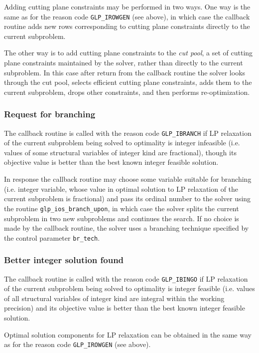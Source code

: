 Adding cutting plane constraints may be performed in two ways.
One way is the same as for the reason code \verb|GLP_IROWGEN| (see
above), in which case the callback routine adds new rows corresponding
to cutting plane constraints directly to the current subproblem.

The other way is to add cutting plane constraints to the {\it cut pool},
a set of cutting plane constraints maintained by the solver, rather than
directly to the current subproblem. In this case after return from the
callback routine the solver looks through the cut pool, selects
efficient cutting plane constraints, adds them to the current
subproblem, drops other constraints, and then performs re-optimization.

\subsubsection*{Request for branching}

The callback routine is called with the reason code \verb|GLP_IBRANCH|
if LP relaxation of the current subproblem being solved to optimality
is integer infeasible (i.e. values of some structural variables of
integer kind are fractional), though its objective value is better than
the best known integer feasible solution.

In response the callback routine may choose some variable suitable for
branching (i.e. integer variable, whose value in optimal solution to
LP relaxation of the current subproblem is fractional) and pass its
ordinal number to the solver using the routine
\verb|glp_ios_branch_upon|, in which case the solver splits the current
subproblem in two new subproblems and continues the search. If no choice
is made by the callback routine, the solver uses a branching technique
specified by the control parameter \verb|br_tech|.

\subsubsection*{Better integer solution found}

The callback routine is called with the reason code \verb|GLP_IBINGO|
if LP relaxation of the current subproblem being solved to optimality
is integer feasible (i.e. values of all structural variables of integer
kind are integral within the working precision) and its objective value
is better than the best known integer feasible solution.

Optimal solution components for LP relaxation can be obtained in the
same way as for the reason code \verb|GLP_IROWGEN| (see above).

